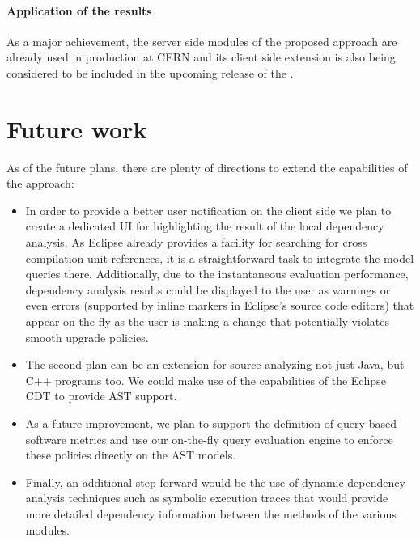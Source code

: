 
% 

\paragraph*{Application of the results}
As a major achievement, the server side modules of the proposed approach are
already used in production at CERN and its client side extension is also being
considered to be included in the upcoming release of the \ptool.

\section{Future work}
As of the future plans, there are plenty of directions to extend the
capabilities of the approach:
\begin{itemize}
\item In order to provide a better user notification on the client side we plan
to create a dedicated UI for highlighting the result of the local dependency
analysis. As Eclipse already provides a facility for searching for cross
compilation unit references, it is a straightforward task to integrate the model
queries there. Additionally, due to the instantaneous evaluation performance,
dependency analysis results could be displayed to the user as warnings or even
errors (supported by inline markers in Eclipse's source code editors) that
appear on-the-fly as the user is making a change that potentially violates
smooth upgrade policies.


\item The second plan can be an extension for source-analyzing not just Java,
but C++ programs too. We could make use of the capabilities of the Eclipse CDT
to provide AST support.

\item As a future improvement, we plan to support the definition of query-based
software metrics and use our on-the-fly query evaluation engine to enforce these
policies directly on the AST models.

\item Finally, an additional step forward would be the use of dynamic dependency
analysis techniques such as symbolic execution traces that would provide more
detailed dependency information between the methods of the various modules.
\end{itemize}
